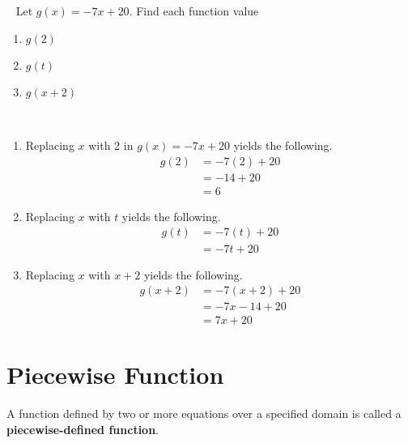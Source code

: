 \begin{example}~\newline
	Let $g(x)=-7x+20$. Find each function value \cite{ci}
	\begin{enumerate}
		\item $g(2)$
		\item $g(t)$
		\item $g(x+2)$\\
	\end{enumerate} 
	\begin{solution}~\newline
		\begin{enumerate}
			\item  Replacing $x$ with 2 in $g(x)=-7x+20$ yields the following.
			      \begin{align}
			      	g(2) & = -7(2) + 20 \\
			      	     & = -14+20     \\
			      	     & = 6          
			      \end{align}
			\item  Replacing $x$ with $t$ yields the following.
			      \begin{align}
			      	g(t) & = -7(t) + 20 \\
			      	     & = -7t+20     
			      \end{align}
			\item  Replacing $x$ with $x+2$ yields the following.
			      \begin{align}
			      	g(x+2) & = -7(x+2) + 20 \\
			      	       & = -7x-14+20    \\
			      	       & =7x+20         
			      \end{align}
		\end{enumerate}    
	\end{solution}
\end{example}

\section{Piecewise Function}
A function defined by two or more equations over a specified 
domain is called a \textbf{piecewise-defined function}. \cite{ci}\\

